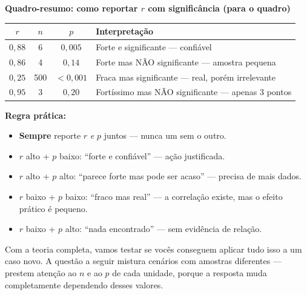 \begin{BoardBox}
\textbf{Quadro-resumo: como reportar $r$ com significância (para o quadro)}

\medskip
\begin{tabular}{|c|c|c|l|}
\hline
\textbf{$r$} & \textbf{$n$} & \textbf{$p$} & \textbf{Interpretação} \\
\hline
$0{,}88$ & 6 & $0{,}005$ & Forte e significante — confiável \\
$0{,}86$ & 4 & $0{,}14$ & Forte mas NÃO significante — amostra pequena \\
$0{,}25$ & 500 & $< 0{,}001$ & Fraca mas significante — real, porém irrelevante \\
$0{,}95$ & 3 & $0{,}20$ & Fortíssimo mas NÃO significante — apenas 3 pontos \\
\hline
\end{tabular}

\medskip
\textbf{Regra prática:}
\begin{itemize}
  \item \textbf{Sempre} reporte $r$ \emph{e} $p$ juntos — nunca um sem o outro.
  \item $r$ alto + $p$ baixo: ``forte e confiável'' — ação justificada.
  \item $r$ alto + $p$ alto: ``parece forte mas pode ser acaso'' — precisa de mais dados.
  \item $r$ baixo + $p$ baixo: ``fraco mas real'' — a correlação existe, mas o efeito
  prático é pequeno.
  \item $r$ baixo + $p$ alto: ``nada encontrado'' — sem evidência de relação.
\end{itemize}
\end{BoardBox}

Com a teoria completa, vamos testar se vocês conseguem aplicar tudo
isso a um caso novo.
A questão a seguir mistura cenários com amostras diferentes — prestem
atenção ao $n$ e ao $p$ de cada unidade, porque a resposta muda
completamente dependendo desses valores.

